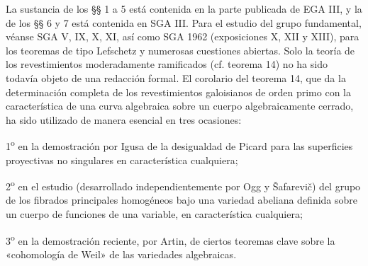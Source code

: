 La sustancia de los §§ 1 a 5 está contenida en la parte publicada de EGA III, y
la de los §§ 6 y 7 está contenida en SGA III. Para el estudio del grupo
fundamental, véanse SGA V, IX, X, XI, así como SGA 1962 (exposiciones X, XII y
XIII), para los teoremas de tipo Lefschetz y numerosas cuestiones abiertas.
Solo la teoría de los revestimientos moderadamente ramificados (cf. teorema 14)
no ha sido todavía objeto de una redacción formal. El corolario del teorema 14,
que da la determinación completa de los revestimientos galoisianos de orden
primo con la característica de una curva algebraica sobre un cuerpo
algebraicamente cerrado, ha sido utilizado de manera esencial en tres ocasiones:

1\textsuperscript{o} en la demostración por Igusa de la desigualdad de Picard
para las superficies proyectivas no singulares en característica cualquiera;

2\textsuperscript{o} en el estudio (desarrollado independientemente por Ogg y
Šafarevič) del grupo de los fibrados principales homogéneos bajo una variedad
abeliana definida sobre un cuerpo de funciones de una variable, en
característica cualquiera;

3\textsuperscript{o} en la demostración reciente, por Artin, de ciertos
teoremas clave sobre la «cohomología de Weil» de las variedades algebraicas.
